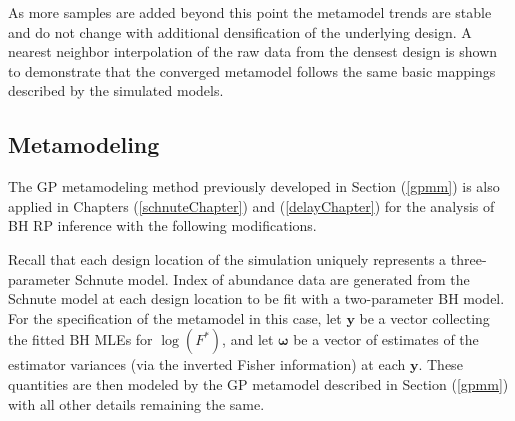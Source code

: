 %
\clearpage
\noindent
As more samples are added beyond this point the metamodel trends are stable 
and do not change with additional densification of the underlying design. A 
nearest neighbor interpolation of the raw data from the densest design is 
shown to demonstrate that the converged metamodel follows the same basic 
mappings described by the simulated models.%

\subsection{Metamodeling}

%
The GP metamodeling method previously developed in Section (\ref{gpmm}) is 
also applied in Chapters (\ref{schnuteChapter}) and (\ref{delayChapter}) for the 
analysis of BH RP inference with the following modifications.

Recall that each design location of the simulation uniquely represents a three-parameter 
Schnute model. Index of abundance data are generated from the Schnute model 
at each design location to be fit with a two-parameter BH model.
For the specification of the metamodel in this case, let $\textbf{y}$ 
be a vector collecting the fitted BH MLEs for $\log(F^*)$, and let
$\bm{\omega}$ be a vector of estimates of the estimator variances (via the
inverted Fisher information) at each $\textbf{y}$. These quantities are then 
modeled by the GP metamodel described in Section (\ref{gpmm}) with all other details 
remaining the same.

